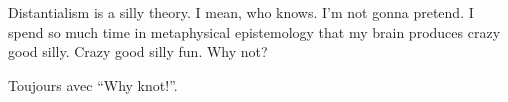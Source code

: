 

Distantialism is a silly theory.  I mean, who knows.  I'm not gonna
pretend.  I spend so much time in metaphysical epistemology that my
brain produces crazy good silly.  Crazy good silly fun.  Why not?

Toujours avec ``Why knot!''.

\bye
